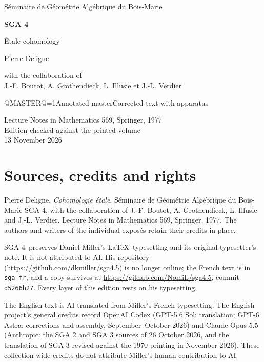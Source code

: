 \documentclass[oneside]{book}
\makeatletter
\theoremstyle{sga-source}
\theoremstyle{sga-source-dash}
\theoremstyle{sga-source-dotdash}
\theoremstyle{sga-source-number-note-dash}
\theoremstyle{sga-source-note-number-dotdash}
\theoremstyle{sga-source-example-dotdash}
\theoremstyle{sga-source-inline-number}
\theoremstyle{sga-source-bare-number}
\theoremstyle{sga-source}
\providecommand\EditionIsMaster{@MASTER@}
\makeatother
\begin{document}
\begin{titlepage}
\centering
\vspace*{2cm}
{\Large Séminaire de Géométrie Algébrique du Bois-Marie\par}
\vspace{0.7cm}
{\Huge\bfseries SGA 4\textonehalf\par}
\vspace{0.8cm}
{\huge Étale cohomology\par}
\vspace{1cm}
{\Large Pierre Deligne\par}
\vspace{0.5cm}
with the collaboration of\\[0.3em]
J.-F. Boutot, A. Grothendieck, L. Illusie et J.-L. Verdier
\vfill
{\Large \ifnum\EditionIsMaster=1\relax Annotated master\else Corrected text with apparatus\fi\par}
\vspace{0.7cm}
Lecture Notes in Mathematics 569, Springer, 1977\\[0.4em]
Edition checked against the printed volume\\
13 November 2026
\end{titlepage}

\chapter*{Sources, credits and rights}
Pierre Deligne, \emph{Cohomologie étale}, Séminaire de Géométrie Algébrique
du Bois-Marie SGA 4\textonehalf, with the collaboration of J.-F. Boutot,
A. Grothendieck, L. Illusie and J.-L. Verdier, Lecture Notes in Mathematics
569, Springer, 1977. The authors and writers of the individual exposés
retain their credits in place.

\medskip
SGA 4\textonehalf\ preserves Daniel Miller’s \LaTeX\ typesetting and its
original typesetter’s note. It is not attributed to AI. His repository
(\url{https://github.com/dkmiller/sga4.5}) is no longer online; the French
text is in \texttt{sga-fr}, and a copy survives at
\url{https://github.com/NomiL/sga4.5}, commit \texttt{d5266b27}.
Every layer of this edition rests on his typesetting.

\medskip
The English text is AI-translated from Miller’s French typesetting.
The English project’s general credits record OpenAI Codex (GPT-5.6 Sol:
translation; GPT-6 Astra: corrections and assembly, September--October
2026) and Claude Opus 5.5 (Anthropic: the SGA 2 and SGA 3 sources of
26 October 2026, and the translation of SGA 3 revised against the 1970
printing in November 2026). These collection-wide credits do not attribute
Miller’s human contribution to AI.
\end{document}
